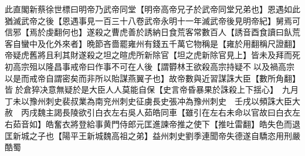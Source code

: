 此直閣新蔡徐世標曰明帝乃武帝同堂【明帝高帝兄子於武帝同堂兄弟也】恩遇如此猶滅武帝之後【恩遇事見一百三十八卷武帝永明十一年滅武帝後見明帝紀】舅焉可信邪【焉於虔翻何也】遂殺之曹虎善於誘納日食荒客常數百人【誘音酉食讀曰飤荒客自蠻中及化外來者】晩節吝嗇罷雍州有錢五千萬它物稱是【雍於用翻稱尺證翻】帝疑虎舊將且利其財遂殺之坦之暄虎所新除官【坦之虎新除官見上】皆未及拜而死初高宗殂以隆昌事戒帝曰作事不可在人後【謂欎林王欲殺高宗持疑不以及禍高宗以是而戒帝自謂密矣而非所以貽謀燕翼子也】故帝數與近習謀誅大臣【數所角翻】皆於倉猝决意無疑於是大臣人人莫能自保【史言帝昏暴果於誅殺上下揺心】　九月丁未以豫州刺史裴叔業為南兖州刺史征虜長史張冲為豫州刺史　壬戌以頻誅大臣大赦　丙戌魏主謁長陵欲引白衣左右吳人茹皓同車【雖引在左右未命以官故曰白衣左右茹音如】皓奮衣將登給事黄門侍郎元匡進諫帝推之使下【推吐雷翻】皓失色而退匡新城之子也【陽平王新城魏高祖之弟】益州刺史劉季連聞帝失德遂自驕恣用刑嚴酷蜀

